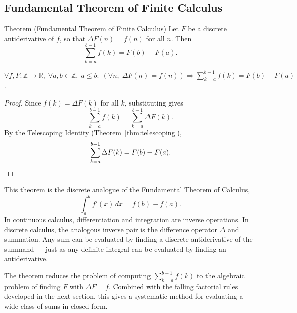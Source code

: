 
\subsection*{Fundamental Theorem of Finite Calculus}

\begin{theorembox}{Theorem (Fundamental Theorem of Finite Calculus)}
Let \(F\) be a discrete antiderivative of \(f\), so that
\(\Delta F(n) = f(n)\) for all \(n\). Then
\[
\sum_{k=a}^{b-1} f(k) = F(b) - F(a).
\]
\end{theorembox}
\label{thm:ftfc}

\begin{remark*}
\(\forall f,F : \mathbb{Z}\to\mathbb{R},\;
\forall a,b \in \mathbb{Z},\; a \le b:\;
(\forall n,\; \Delta F(n) = f(n))
\Rightarrow
\displaystyle\sum_{k=a}^{b-1} f(k) = F(b) - F(a)\).
\end{remark*}

\begin{proof}
Since \(f(k) = \Delta F(k)\) for all \(k\), substituting gives
\[
\sum_{k=a}^{b-1} f(k)
=
\sum_{k=a}^{b-1} \Delta F(k).
\]
By the Telescoping Identity (Theorem~\ref{thm:telescoping}),
\[
\sum_{k=a}^{b-1} \Delta F(k) = F(b) - F(a). \qedhere
\]
\end{proof}

\begin{remark*}
This theorem is the discrete analogue of the Fundamental Theorem of
Calculus,
\[
\int_a^b f'(x)\,dx = f(b)-f(a).
\]
In continuous calculus, differentiation and integration are inverse
operations. In discrete calculus, the analogous inverse pair is the
difference operator \(\Delta\) and summation. Any sum can be evaluated
by finding a discrete antiderivative of the summand --- just as any
definite integral can be evaluated by finding an antiderivative.
\end{remark*}

\begin{remark*}
The theorem reduces the problem of computing \(\sum_{k=a}^{b-1} f(k)\)
to the algebraic problem of finding \(F\) with \(\Delta F = f\). Combined
with the falling factorial rules developed in the next section, this
gives a systematic method for evaluating a wide class of sums in
closed form.
\end{remark*}
